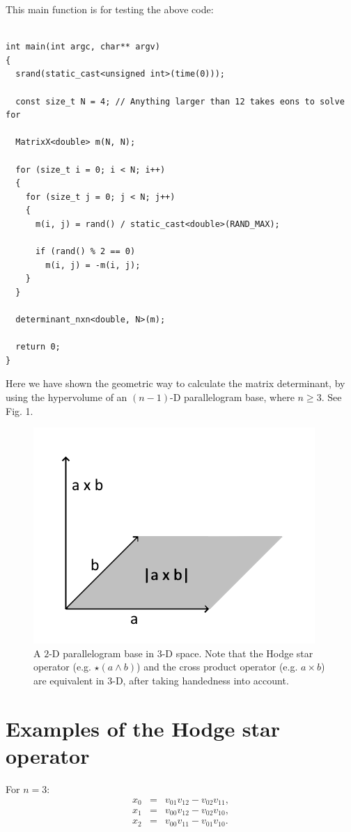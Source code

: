 \documentclass[12pt]{article}
\begin{document}
This main function is for testing the above code:
\begin{lstlisting}

int main(int argc, char** argv)
{
  srand(static_cast<unsigned int>(time(0)));

  const size_t N = 4; // Anything larger than 12 takes eons to solve for

  MatrixX<double> m(N, N);

  for (size_t i = 0; i < N; i++)
  {
    for (size_t j = 0; j < N; j++)
    {
      m(i, j) = rand() / static_cast<double>(RAND_MAX);

      if (rand() % 2 == 0)
        m(i, j) = -m(i, j);
    }
  }

  determinant_nxn<double, N>(m);

  return 0;
}
\end{lstlisting}
Here we have shown the geometric way to calculate the matrix determinant, by using the hypervolume of an $(n - 1)$-D parallelogram base, where $n \ge 3$. 
See Fig. 1.
\begin{figure} 
\centering
  \includegraphics[width = 3 in]{parallelogram.png}
  \caption{
A $2$-D parallelogram base in $3$-D space.
Note that the Hodge star operator (e.g. $\star(a \wedge b)$) and the cross product operator (e.g. $a \times b$) are equivalent in $3$-D, after taking handedness into account.
}
\end{figure}

\section{Examples of the Hodge star operator}
For $n = 3$:
\begin{eqnarray}
x_{0} &=& v_{01} v_{12} - v_{02} v_{11},\\
x_{1} &=& v_{00} v_{12} - v_{02} v_{10},\\
x_{2} &=& v_{00} v_{11} - v_{01} v_{10}.
\end{eqnarray}
\end{document}
